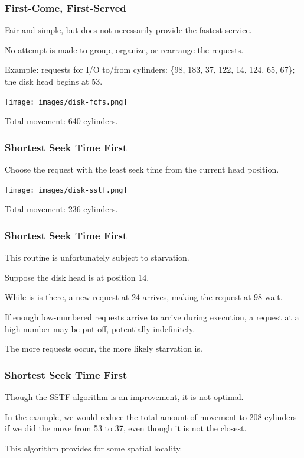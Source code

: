 \begin{frame}
\frametitle{First-Come, First-Served}

Fair and simple, but does not necessarily provide the fastest service.

No attempt is made to group, organize, or rearrange the requests.

Example: requests for I/O to/from cylinders: \{98, 183, 37, 122, 14, 124, 65, 67\}; the disk head begins at 53.

\begin{center}
	\texttt{[image: images/disk-fcfs.png]}
\end{center}

Total movement: 640 cylinders.

\end{frame}

\begin{frame}
\frametitle{Shortest Seek Time First}

Choose the request with the least seek time from the current head position.

\begin{center}
	\texttt{[image: images/disk-sstf.png]}
\end{center}

Total movement: 236 cylinders.

\end{frame}

\begin{frame}
\frametitle{Shortest Seek Time First}

This routine is unfortunately subject to starvation. 

Suppose the disk head is at position 14. 

While is is there, a new request at 24 arrives, making the request at 98 wait. 

If enough low-numbered requests arrive to arrive during execution, a request at a high number may be put off, potentially indefinitely. 

The more requests occur, the more likely starvation is.

\end{frame}

\begin{frame}
\frametitle{Shortest Seek Time First}

Though the SSTF algorithm is an improvement, it is not optimal. 

In the example, we would reduce the total amount of movement to 208 cylinders if we did the move from 53 to 37, even though it is not the closest.

This algorithm provides for some spatial locality.

\end{frame}

